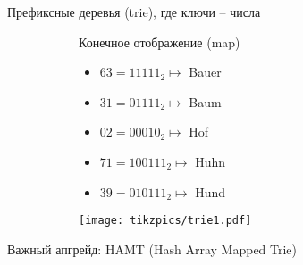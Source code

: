 \begin{frame}{Префиксные деревья (trie), где ключи -- числа}
\begin{figure}[ht]
\begin{subfigure}{.39\textwidth}
Конечное отображение (map)
\begin{itemize}
\item $63=11111_2\mapsto$ Bauer 
\item $31=01111_2\mapsto$ Baum 
\item $02=00010_2\mapsto$ Hof 
\item $71=100111_2\mapsto$ Huhn
\item $39=010111_2\mapsto$ Hund
\end{itemize}
\end{subfigure}
\begin{subfigure}{.59\textwidth}
\texttt{[image: tikzpics/trie1.pdf]}
\end{subfigure}
\end{figure}
\vspace{2em}
Важный апгрейд: HAMT (Hash Array Mapped Trie)
\end{frame}

